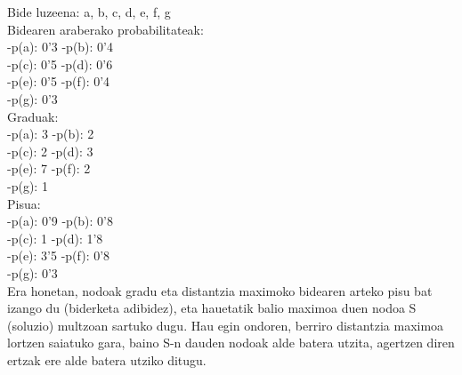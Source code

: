 \documentclass[eu,gi]{ifirak}\usepackage[]{graphicx}\usepackage[]{color}
\begin{document}
\hspace*{1cm}			Bide luzeena: {a, b, c, d, e, f, g}\\
\hspace*{1cm}			Bidearen araberako probabilitateak:\\
\hspace*{2cm}				-p(a): 0'3		\hspace*{1.5cm}	-p(b): 0'4\\
\hspace*{2cm}				-p(c): 0'5		\hspace*{1.5cm}	-p(d): 0'6\\
\hspace*{2cm}				-p(e): 0'5		\hspace*{1.5cm}	-p(f): 0'4\\
\hspace*{2cm}				-p(g): 0'3\\
\hspace*{1cm}			Graduak:\\
\hspace*{2cm}				-p(a): 3 		\hspace*{1.8cm}	-p(b): 2\\
\hspace*{2cm}				-p(c): 2 		\hspace*{1.8cm}	-p(d): 3\\
\hspace*{2cm}				-p(e): 7		\hspace*{1.8cm}	-p(f): 2\\
\hspace*{2cm}				-p(g): 1\\
\hspace*{1cm}			Pisua:\\
\hspace*{2cm}		    -p(a): 0'9 		\hspace*{1.5cm}	-p(b): 0'8\\
\hspace*{2cm}			-p(c): 1 		\hspace*{1.8cm}	-p(d): 1'8\\
\hspace*{2cm}			-p(e): 3'5		\hspace*{1.5cm}	-p(f): 0'8\\
\hspace*{2cm}		    -p(g): 0'3\\

 Era honetan, nodoak gradu eta distantzia maximoko bidearen arteko pisu bat izango du (biderketa adibidez), eta hauetatik balio maximoa duen nodoa S (soluzio) multzoan sartuko dugu. Hau egin ondoren, berriro distantzia maximoa lortzen saiatuko gara, baino S-n dauden nodoak alde batera utzita, agertzen diren ertzak ere alde batera utziko ditugu.\\
\end{document}
